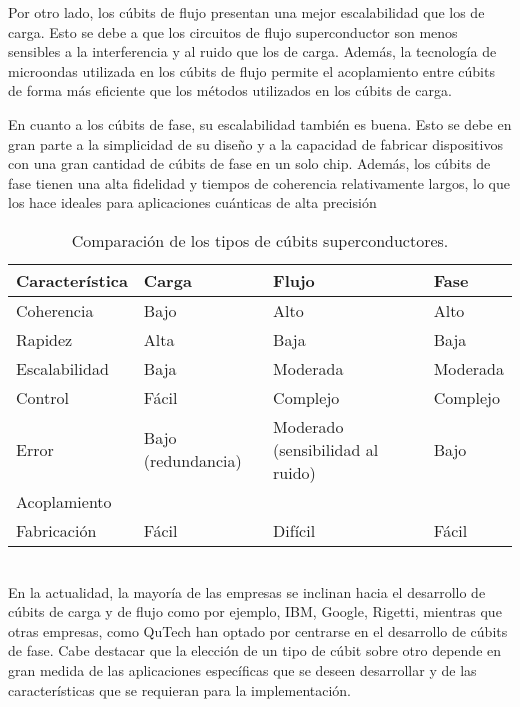 \documentclass[11pt]{article}
\begin{document}
Por otro lado, los cúbits de flujo presentan una mejor escalabilidad que los de carga. Esto se debe a que los circuitos de flujo superconductor son menos sensibles a la interferencia y al ruido que los de carga. Además, la tecnología de microondas utilizada en los cúbits de flujo permite el acoplamiento entre cúbits de forma más eficiente que los métodos utilizados en los cúbits de carga.

En cuanto a los cúbits de fase, su escalabilidad también es buena. Esto se debe en gran parte a la simplicidad de su diseño y a la capacidad de fabricar dispositivos con una gran cantidad de cúbits de fase en un solo chip. Además, los cúbits de fase tienen una alta fidelidad y tiempos de coherencia relativamente largos, lo que los hace ideales para aplicaciones cuánticas de alta precisión\\
 \begin{table}[ht]
  \small
    \begin{center}
      \begin{tabularx}{\textwidth}{|X|X|X|X|}
      \hline
      \textbf{Característica} & \textbf{Carga} & \textbf{Flujo} & \textbf{Fase} \\ \hline
      Coherencia & Bajo & Alto & Alto \\
      Rapidez & Alta & Baja & Baja \\
      Escalabilidad & Baja & Moderada & Moderada \\
      Control & Fácil & Complejo & Complejo \\
      Error & Bajo (redundancia) & Moderado (sensibilidad al ruido) & Bajo \\
      Acoplamiento & & &  \\
      Fabricación & Fácil & Difícil & Fácil \\
      \hline
      \end{tabularx}
      \caption{Comparación de los tipos de cúbits superconductores.}
      \label{tab:comparacion-cubits-superconductores-transpuesta}
    \end{center}
\end{table}\\
En la actualidad, la mayoría de las empresas se inclinan hacia el desarrollo de cúbits de carga y de flujo como  por ejemplo, IBM, Google, Rigetti, mientras que otras empresas, como QuTech han optado por centrarse en el desarrollo de cúbits de fase. Cabe destacar que la elección de un tipo de cúbit sobre otro depende en gran medida de las aplicaciones específicas que se deseen desarrollar y de las características que se requieran para la implementación.
\end{document}
